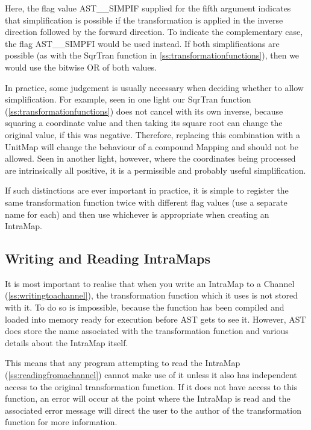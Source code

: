 \documentclass[twoside,11pt]{article}
\newcommand{\htmlref}[2]{#1}
\newcommand{\secref}[1]{\S\ref{#1}}
\renewcommand{\secref}[1]{\ref{#1}}
\begin{document}
Here, the flag value AST\_\_SIMPIF supplied for the fifth argument
indicates that simplification is possible if the transformation is
applied in the inverse direction followed by the forward direction. To
indicate the complementary case, the flag AST\_\_SIMPFI would be used
instead. If both simplifications are possible (as with the SqrTran
function in \secref{ss:transformationfunctions}), then we would use
the bitwise OR of both values.

In practice, some judgement is usually necessary when deciding whether
to allow simplification. For example, seen in one light our SqrTran
function (\secref{ss:transformationfunctions}) does not cancel with
its own inverse, because squaring a coordinate value and then taking
its square root can change the original value, if this was
negative. Therefore, replacing this combination with a UnitMap will
change the behaviour of a compound Mapping and should not be
allowed. Seen in another light, however, where the coordinates being
processed are intrinsically all positive, it is a permissible and
probably useful simplification.

If such distinctions are ever important in practice, it is simple to
register the same transformation function twice with different flag
values (use a separate name for each) and then use whichever is
appropriate when creating an \htmlref{IntraMap}{IntraMap}.

\subsection{\label{ss:readingandwritingintramaps}Writing and Reading IntraMaps}

It is most important to realise that when you write an \htmlref{IntraMap}{IntraMap} to a
\htmlref{Channel}{Channel} (\secref{ss:writingtoachannel}), the transformation function
which it uses is not stored with it. To do so is impossible, because
the function has been compiled and loaded into memory ready for
execution before AST gets to see it. However, AST does store the name
associated with the transformation function and various details about
the IntraMap itself.


This means that any program attempting to read the IntraMap
(\secref{ss:readingfromachannel}) cannot make use of it unless it also
has independent access to the original transformation function. If it
does not have access to this function, an error will occur at the
point where the IntraMap is read and the associated error message will
direct the user to the author of the transformation function for more
information.
\end{document}
